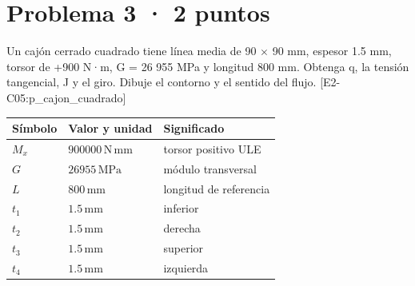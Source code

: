 \par\medskip\noindent\begin{minipage}{\linewidth}

\section{Problema 3 · 2 puntos}

Un cajón cerrado cuadrado tiene línea media de 90 \ensuremath{\times} 90 mm, espesor 1.5 mm, torsor de +900 N·m, G = 26 955 MPa y longitud 800 mm. Obtenga q, la tensión tangencial, J y el giro. Dibuje el contorno y el sentido del flujo. [E2-C05:p\_cajon\_cuadrado]

\par\medskip\noindent\begin{tabular}{@{}p{.18\linewidth}p{.26\linewidth}p{.48\linewidth}@{}}
\toprule Símbolo & Valor y unidad & Significado\\\midrule
$M_{x}$ & $900000\,\mathrm{N\,mm}$ & torsor positivo ULE\\
$G$ & $26955\,\mathrm{MPa}$ & módulo transversal\\
$L$ & $800\,\mathrm{mm}$ & longitud de referencia\\
$t_{1}$ & $1.5\,\mathrm{mm}$ & inferior\\
$t_{2}$ & $1.5\,\mathrm{mm}$ & derecha\\
$t_{3}$ & $1.5\,\mathrm{mm}$ & superior\\
$t_{4}$ & $1.5\,\mathrm{mm}$ & izquierda\\
\bottomrule\end{tabular}\par\medskip


\end{minipage}
